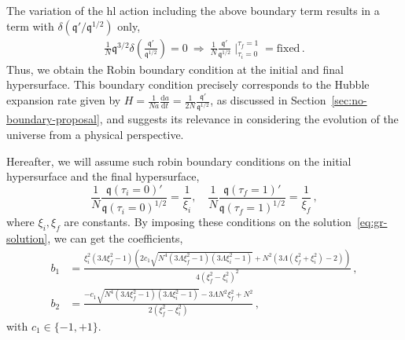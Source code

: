 \documentclass[superscriptaddress,aps,preprintnumbers,nofootinbib]{revtex4-2}
\begin{document}
The variation of the \ac{hl} action including the above boundary term results in a term with $\delta ({{\mathfrak{q}'}}/{\mathfrak{q}^{1/2}})$ only,
\begin{align}
\frac{1}{N} \mathfrak{q}^{3/2} \delta
\left(\frac{{\mathfrak{q}'}}{\mathfrak{q}^{1/2}}\right) = 0\ 
\Longrightarrow \ \frac{1}{N}\frac{{\mathfrak{q}'}}{\mathfrak{q}^{1/2}}\mid^{\tau_f=1}_{\tau_i=0} = \textrm{fixed} \,. 
\end{align}
Thus, we obtain the Robin boundary condition at the initial and final hypersurface. This boundary condition precisely corresponds to the Hubble expansion rate given by ${H}=\frac{1}{Na}\frac{\mathrm{d} a}{\mathrm{d} t}=\frac{1}{2N}\frac{{\mathfrak{q}'}}{\mathfrak{q}^{1/2}}$, as discussed in Section~\ref{sec:no-boundary-proposal},
and suggests its relevance in considering the evolution of the universe from a physical perspective.


Hereafter, we will assume such robin boundary conditions on the initial hypersurface and the final hypersurface,
\begin{equation}\label{eq:hubble-boundary-gr}
\frac{1}{N}
\frac{\mathfrak{q}(\tau_{i}=0)'}{\mathfrak{q}(\tau_{i}=0)^{1/2}}
=\frac{1}{\xi_{i}}, \quad \frac{1}{N}
\frac{\mathfrak{q}(\tau_{f}=1)'}{\mathfrak{q}(\tau_{f}=1)^{1/2}}
=\frac{1}{\xi_{f}}\,,
\end{equation}
where $\xi_{i},\xi_{f}$ are constants. By imposing these conditions on the solution~\eqref{eq:gr-solution}, we can get the coefficients,
\begin{align}
b_{1}&=\frac{\xi_i^2 (3 \Lambda  \xi _f^2-1) 
\left(2c_1 \sqrt{N^4 (3 \Lambda  \xi _f^2-1) 
\left(3 \Lambda  \xi _i^2-1\right)}+N^2 \left(3 \Lambda 
(\xi _f^2+\xi _i^2)-2\right)\right)}{4(\xi _f^2-\xi _i^2)^2}\,, \\
b_{2}&=\frac{-c_1\sqrt{N^4(3 \Lambda  \xi _f^2-1)(3 \Lambda  \xi _i^2-1)}
-3\Lambda N^2\xi_f^2+N^2}{2(\xi _f^2-\xi _i^2)}\,, 
\end{align}
with $c_{1} \in \{-1 , +1\}$.
\end{document}
